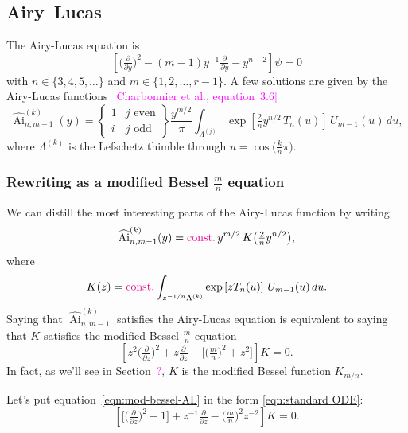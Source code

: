 \documentclass{article}
\theoremstyle{definition}
\DeclareMathOperator{\Ai}{Ai}
\begin{document}
\subsection{Airy--Lucas}
The Airy-Lucas equation is
\begin{equation}\label{eqn:airy-lucas}
\left[\big(\tfrac{\partial}{\partial y}\big)^2 - (m-1) y^{-1} \tfrac{\partial}{\partial y} - y^{n-2}\right] \psi = 0
\end{equation}
with $n \in \{3, 4, 5, \ldots\}$ and $m \in \{1, 2, \ldots, r-1\}$. A few solutions are given by the Airy-Lucas functions~\textcolor{magenta}{[Charbonnier et al., equation~3.6]}
\[ \widehat{\Ai}^{(k)}_{n, m-1}(y) = \left\{\begin{array}{ll}1 & j \text{ even} \\ i & j \text{ odd}\end{array}\right\} \frac{y^{m/2}}{\pi} \int_{\Lambda^{(j)}} \exp\left[\tfrac{2}{n} y^{n/2}\,T_n(u)\right]\,U_{m-1}(u)\,du, \]
where $\Lambda^{(k)}$ is the Lefschetz thimble through $u = \cos\big(\tfrac{k}{n}\pi\big)$.

\subsubsection{Rewriting as a modified Bessel $\frac{m}{n}$ equation}
We can distill the most interesting parts of the Airy-Lucas function by writing
\[ \widehat{\Ai}^{(k)}_{n, m-1}(y) = \textcolor{magenta}{\text{const.}}\,y^{{m/2}}\,K\big(\tfrac{2}{n} y^{n/2}\big), \]
where
\begin{equation}\label{integral:mod-bessel-rational-AL}
K(z) = \textcolor{magenta}{\text{const.}} \int_{z^{-{1/n}}\Lambda^{(k)}} \exp\left[z T_n(u)\right]\,U_{m-1}(u)\,du.
\end{equation}
Saying that $\widehat{\Ai}^{(k)}_{n, m-1}$ satisfies the Airy-Lucas equation is equivalent to saying that $K$ satisfies the modified Bessel $\frac{m}{n}$ equation
\begin{equation}\label{eqn:mod-bessel-AL}
\left[z^2 \big(\tfrac{\partial}{\partial z}\big)^2 + z \tfrac{\partial}{\partial z} - \big[\big(\tfrac{m}{n} \big)^2 + z^2\big]\right] K = 0.
\end{equation}
In fact, as we'll see in Section~\textcolor{magenta}{?}, $K$ is the modified Bessel function $K_{{m/n}}$.

Let's put equation~\eqref{eqn:mod-bessel-AL} in the form \eqref{eqn:standard ODE}:
\begin{equation}\label{eqn:reg-mod-bessel-AL}
\left[ \big[ \big(\tfrac{\partial}{\partial z}\big)^2 - 1 \big] + z^{-1} \tfrac{\partial}{\partial z} - \big({\tfrac{m}{n}}\big)^2 z^{-2} \right] K = 0.
\end{equation}
\end{document}
